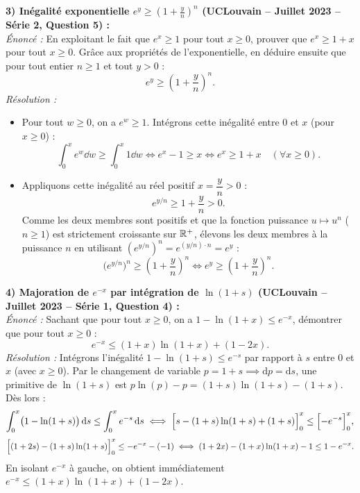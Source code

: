 \begin{exemple}
\medskip
\textbf{3) Inégalité exponentielle $e^y \ge \left(1 + \frac{y}{n}\right)^n$ (UCLouvain -- Juillet 2023 -- Série 2, Question 5) :}\\
\emph{Énoncé :} En exploitant le fait que $e^x \ge 1$ pour tout $x \ge 0$, prouver que $e^x \ge 1 + x$ pour tout $x \ge 0$. Grâce aux propriétés de l'exponentielle, en déduire ensuite que pour tout entier $n \ge 1$ et tout $y > 0$ :
\[
    e^y \ge \left(1 + \frac{y}{n}\right)^n.
\]
\emph{Résolution :}
\begin{itemize}
    \item Pour tout $w \ge 0$, on a $e^w \ge 1$. Intégrons cette inégalité entre $0$ et $x$ (pour $x \ge 0$) :
    \[
        \int_0^x e^w\dd w \ge \int_0^x 1\dd w \iff e^x - 1 \ge x \iff \boxed{e^x \ge 1 + x \quad (\forall x \ge 0)}.
    \]
    \item Appliquons cette inégalité au réel positif $x = \dfrac{y}{n} > 0$ :
    \[
        e^{y/n} \ge 1 + \frac{y}{n} > 0.
    \]
    Comme les deux membres sont positifs et que la fonction puissance $u \mapsto u^n$ ($n \ge 1$) est strictement croissante sur $\mathbb{R}^+$, élevons les deux membres à la puissance $n$ en utilisant $(e^{y/n})^n = e^{(y/n)\cdot n} = e^y$ :
    \[
        \bigl(e^{y/n}\bigr)^n \ge \left(1 + \frac{y}{n}\right)^n \iff \boxed{e^y \ge \left(1 + \frac{y}{n}\right)^n}.
    \]
\end{itemize}

\medskip
\textbf{4) Majoration de $e^{-x}$ par intégration de $\ln(1+s)$ (UCLouvain -- Juillet 2023 -- Série 1, Question 4) :}\\
\emph{Énoncé :} Sachant que pour tout $x \ge 0$, on a $1 - \ln(1+x) \le e^{-x}$, démontrer que pour tout $x \ge 0$ :
\[
    e^{-x} \le (1 + x)\ln(1 + x) + (1 - 2x).
\]
\emph{Résolution :} Intégrons l'inégalité $1 - \ln(1+s) \le e^{-s}$ par rapport à $s$ entre $0$ et $x$ (avec $x \ge 0$). Par le changement de variable $p = 1 + s \implies \mathrm{d}p = \mathrm{d}s$, une primitive de $\ln(1+s)$ est $p\ln(p) - p = (1+s)\ln(1+s) - (1+s)$. Dès lors :
\[
    \int_0^x \bigl(1 - \ln(1+s)\bigr)\,\mathrm{d} s \le \int_0^x e^{-s}\,\mathrm{d} s \iff \Bigl[s - (1+s)\ln(1+s) + (1+s)\Bigr]_0^x \le \Bigl[-e^{-s}\Bigr]_0^x,
\]
\[
    \Bigl[(1 + 2s) - (1+s)\ln(1+s)\Bigr]_0^x \le -e^{-x} - (-1) \iff (1 + 2x) - (1+x)\ln(1+x) - 1 \le 1 - e^{-x}.
\]
En isolant $e^{-x}$ à gauche, on obtient immédiatement $\boxed{e^{-x} \le (1+x)\ln(1+x) + (1 - 2x)}$.
\end{exemple}

